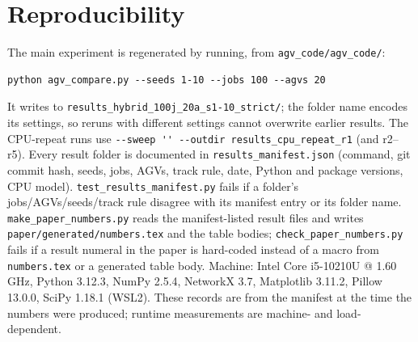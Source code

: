 \section{Reproducibility}
\label{sec:reproducibility}

The main experiment is regenerated by running, from \texttt{agv\_code/agv\_code/}:

\begin{verbatim}
python agv_compare.py --seeds 1-10 --jobs 100 --agvs 20
\end{verbatim}

It writes to \texttt{results\_hybrid\_100j\_20a\_s1-10\_strict/}; the folder name encodes its settings, so reruns with different settings cannot overwrite earlier results. The CPU-repeat runs use \verb|--sweep '' --outdir results_cpu_repeat_r1| (and r2--r5). Every result folder is documented in \texttt{results\_manifest.json} (command, git commit hash, seeds, jobs, AGVs, track rule, date, Python and package versions, CPU model). \texttt{test\_results\_manifest.py} fails if a folder's jobs/AGVs/seeds/track rule disagree with its manifest entry or its folder name. \texttt{make\_paper\_numbers.py} reads the manifest-listed result files and writes \texttt{paper/generated/numbers.tex} and the table bodies; \texttt{check\_paper\_numbers.py} fails if a result numeral in the paper is hard-coded instead of a macro from \texttt{numbers.tex} or a generated table body. Machine: Intel Core i5-10210U @ 1.60 GHz, Python 3.12.3, NumPy 2.5.4, NetworkX 3.7, Matplotlib 3.11.2, Pillow 13.0.0, SciPy 1.18.1 (WSL2). These records are from the manifest at the time the numbers were produced; runtime measurements are machine- and load-dependent.
